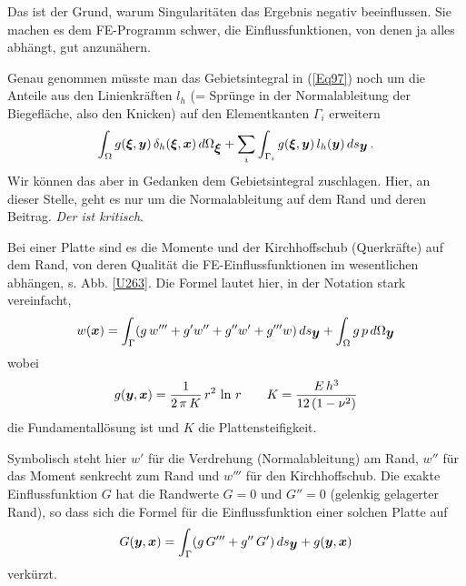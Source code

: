 {Das ist der Grund, warum Singularit\"{a}ten das Ergebnis negativ beeinflussen. Sie machen es dem FE-Programm schwer, die Einflussfunktionen, von denen ja alles abh\"{a}ngt, gut anzun\"{a}hern.\\

\begin{remark}
Genau genommen m\"{u}sste man das Gebietsintegral in (\ref{Eq97}) noch um die Anteile aus den Linienkr\"{a}ften $l_h$ (= Spr\"{u}nge in der Normal\-ableitung der Biegefl\"{a}che, also den Knicken) auf den Elementkanten $\Gamma_i$ erweitern
\begin{align}
\int_{\Omega}g(\mbox{\boldmath $\xi$},\mbox{\boldmath $y$}) \,\delta_h(\mbox{\boldmath $\xi$},\mbox{\boldmath $x$})\,d\Omega_{\mbox{\boldmath $\xi$}} + \sum_i \int_{\Gamma_i} g(\mbox{\boldmath $\xi$},\mbox{\boldmath $y$}) \,l_h(\mbox{\boldmath $y$})\,ds_{\mbox{\boldmath $y$}}\,.
\end{align}
Wir k\"{o}nnen das aber in Gedanken dem Gebietsintegral zuschlagen. Hier, an dieser Stelle, geht es nur um die Normalableitung auf dem Rand und deren Beitrag. {\em Der ist kritisch\/}.
\end{remark}

Bei einer Platte sind es die Momente und der Kirchhoffschub (Querkr\"{a}fte) auf dem Rand, von deren Qualit\"{a}t die FE-Einflussfunktionen im wesentlichen abh\"{a}ngen, s. Abb. \ref{U263}. Die Formel lautet hier, in der Notation stark vereinfacht,
\begin{align}\label{Eq144}
w(\mbox{\boldmath $x$}) = \int_{\Gamma} (g\,w''' + g' w'' + g'' w' + g''' w)\,ds_{\mbox{\boldmath $y$}} + \int_{\Omega} g\,p\,d\Omega_{\mbox{\boldmath $y$}}
\end{align}
wobei
\begin{align}
g(\mbox{\boldmath $y$},\mbox{\boldmath $x$}) = \frac{1}{2\,\pi\,K}\,r^2\,\ln\,r \qquad K = \frac{E\,h^3}{12\,(1 - \nu^2)}
\end{align}
die Fundamentall\"{o}sung ist und $K$ die Plattensteifigkeit.

Symbolisch steht hier $w'$ f\"{u}r die Verdrehung (Normalableitung) am Rand, $w''$ f\"{u}r das Moment senkrecht zum Rand und $w'''$ f\"{u}r den Kirchhoffschub. Die exakte Einflussfunktion $G$ hat die Randwerte $G = 0$ und $G'' = 0$ (gelenkig gelagerter Rand), so dass sich die Formel f\"{u}r die Einflussfunktion einer solchen Platte auf
\begin{align}
G(\mbox{\boldmath $y$},\mbox{\boldmath $x$}) = \int_{\Gamma} (g\,G''' + g'' \,G')\,ds_{\mbox{\boldmath $y$}} + g(\mbox{\boldmath $y$},\mbox{\boldmath $x$})
\end{align}
verk\"{u}rzt.

}
